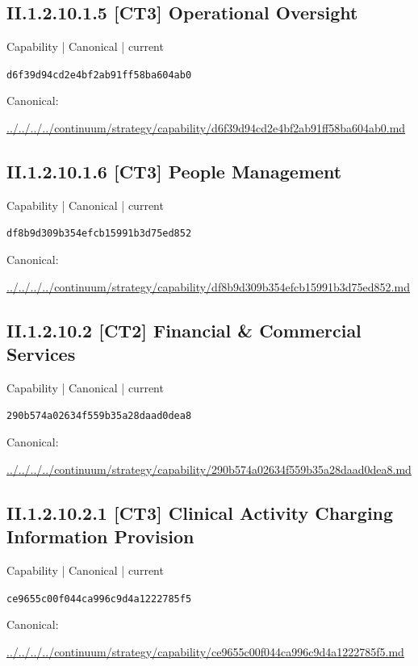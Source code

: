 \documentclass[10pt,a4paper]{article}
\begin{document}
\subsection*{II.1.2.10.1.5 [CT3] Operational Oversight}
{\small Capability | Canonical | current}\par
\texttt{d6f39d94cd2e4bf2ab91ff58ba604ab0}\par
Canonical: \par
{\footnotesize\url{../../../../continuum/strategy/capability/d6f39d94cd2e4bf2ab91ff58ba604ab0.md}}\par
\subsection*{II.1.2.10.1.6 [CT3] People Management}
{\small Capability | Canonical | current}\par
\texttt{df8b9d309b354efcb15991b3d75ed852}\par
Canonical: \par
{\footnotesize\url{../../../../continuum/strategy/capability/df8b9d309b354efcb15991b3d75ed852.md}}\par
\subsection*{II.1.2.10.2 [CT2] Financial \& Commercial Services}
{\small Capability | Canonical | current}\par
\texttt{290b574a02634f559b35a28daad0dea8}\par
Canonical: \par
{\footnotesize\url{../../../../continuum/strategy/capability/290b574a02634f559b35a28daad0dea8.md}}\par
\subsection*{II.1.2.10.2.1 [CT3] Clinical Activity Charging Information Provision}
{\small Capability | Canonical | current}\par
\texttt{ce9655c00f044ca996c9d4a1222785f5}\par
Canonical: \par
{\footnotesize\url{../../../../continuum/strategy/capability/ce9655c00f044ca996c9d4a1222785f5.md}}\par
\end{document}
